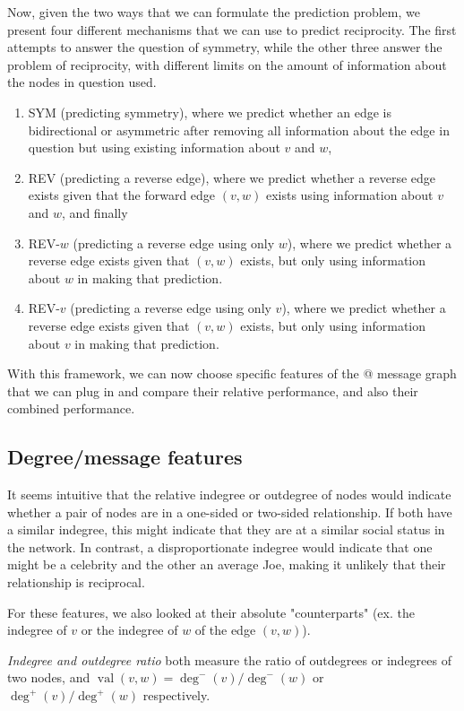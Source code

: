 \documentclass[conference]{IEEEtran}
\begin{document}
Now, given the two ways that we can formulate the prediction problem, we present four different mechanisms that we can use to predict reciprocity. The first attempts to answer the question of symmetry, while the other three answer the problem of reciprocity, with different limits on the amount of information about the nodes in question used.

\begin{enumerate}
\item SYM (predicting symmetry), where we predict whether an edge is bidirectional or asymmetric after removing all information about the edge in question but using existing information about $v$ and $w$, 
\item REV (predicting a reverse edge), where we predict whether a reverse edge exists given that the forward edge $(v,w)$ exists using information about $v$ and $w$, and finally 
\item REV-$w$ (predicting a reverse edge using only $w$), where we predict whether a reverse edge exists given that $(v,w)$ exists, but only using information about $w$ in making that prediction.
\item REV-$v$ (predicting a reverse edge using only $v$), where we predict whether a reverse edge exists given that $(v,w)$ exists, but only using information about $v$ in making that prediction.
\end{enumerate}

With this framework, we can now choose specific features of the @ message graph that we can plug in and compare their relative performance, and also their combined performance.

\subsection{Degree/message features}
It seems intuitive that the relative indegree or outdegree of nodes would indicate whether a pair of nodes are in a one-sided or two-sided relationship. If both have a similar indegree, this might indicate that they are at a similar social status in the network. In contrast, a disproportionate indegree would indicate that one might be a celebrity and the other an average Joe, making it unlikely that their relationship is reciprocal.

For these features, we also looked at their absolute "counterparts" (ex. the indegree of $v$ or the indegree of $w$ of the edge $(v,w)$).

\emph{Indegree and outdegree ratio} both measure the ratio of outdegrees or indegrees of two nodes, and $\operatorname{val}(v,w) = \deg^-(v)/\deg^-(w)$ or $\deg^+(v)/\deg^+(w)$ respectively.
\end{document}
